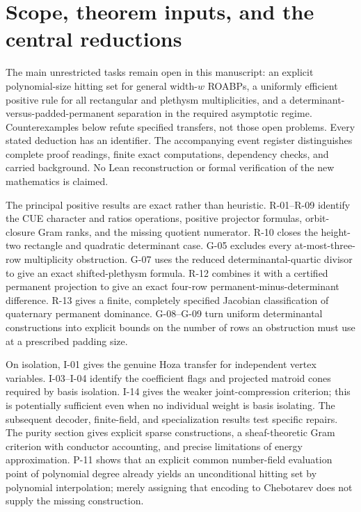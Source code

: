 \section{Scope, theorem inputs, and the central reductions}

The main unrestricted tasks remain open in this manuscript: an explicit polynomial-size hitting set for general width-$w$ ROABPs, a uniformly efficient positive rule for all rectangular and plethysm multiplicities, and a determinant-versus-padded-permanent separation in the required asymptotic regime. Counterexamples below refute specified transfers, not those open problems. Every stated deduction has an identifier. The accompanying event register distinguishes complete proof readings, finite exact computations, dependency checks, and carried background. No Lean reconstruction or formal verification of the new mathematics is claimed.

The principal positive results are exact rather than heuristic. R-01--R-09 identify the CUE character and ratios operations, positive projector formulas, orbit-closure Gram ranks, and the missing quotient numerator. R-10 closes the height-two rectangle and quadratic determinant case. G-05 excludes every at-most-three-row multiplicity obstruction. G-07 uses the reduced determinantal-quartic divisor to give an exact shifted-plethysm formula. R-12 combines it with a certified permanent projection to give an exact four-row permanent-minus-determinant difference. R-13 gives a finite, completely specified Jacobian classification of quaternary permanent dominance. G-08--G-09 turn uniform determinantal constructions into explicit bounds on the number of rows an obstruction must use at a prescribed padding size.

On isolation, I-01 gives the genuine Hoza transfer for independent vertex variables. I-03--I-04 identify the coefficient flags and projected matroid cones required by basis isolation. I-14 gives the weaker joint-compression criterion; this is potentially sufficient even when no individual weight is basis isolating. The subsequent decoder, finite-field, and specialization results test specific repairs. The purity section gives explicit sparse constructions, a sheaf-theoretic Gram criterion with conductor accounting, and precise limitations of energy approximation. P-11 shows that an explicit common number-field evaluation point of polynomial degree already yields an unconditional hitting set by polynomial interpolation; merely assigning that encoding to Chebotarev does not supply the missing construction.

